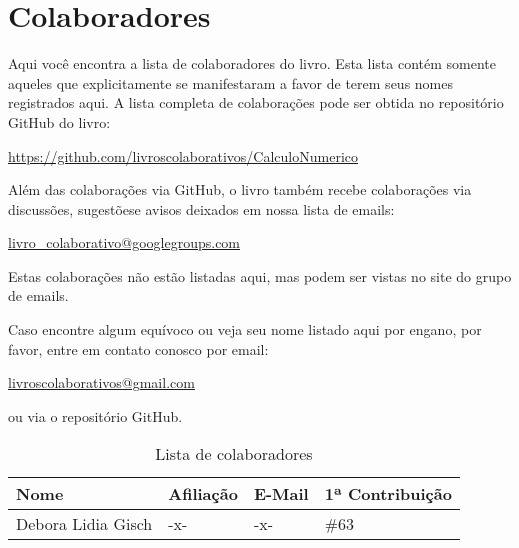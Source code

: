 
%
%
%

\chapter*{Colaboradores}
\fancyhead[LE,RO]{\thepage}

Aqui você encontra a lista de colaboradores do livro. Esta lista contém somente aqueles que explicitamente se manifestaram a favor de terem seus nomes registrados aqui. A lista completa de colaborações pode ser obtida no repositório GitHub do livro:
\begin{center}
  \url{https://github.com/livroscolaborativos/CalculoNumerico}
\end{center}
Além das colaborações via GitHub, o livro também recebe colaborações via discussões, sugestõese avisos deixados em nossa lista de emails:
\begin{center}
\url{livro_colaborativo@googlegroups.com}  
\end{center}
Estas colaborações não estão listadas aqui, mas podem ser vistas no site do grupo de emails.

Caso encontre algum equívoco ou veja seu nome listado aqui por engano, por favor, entre em contato conosco por email:
\begin{center}
  \url{livroscolaborativos@gmail.com}
\end{center}
ou via o repositório GitHub.

\begin{table}[h!]
  \centering
  \caption{Lista de colaboradores}
  \label{tab:colaboradores}
  \begin{tabular}{llll} \hline
    Nome & Afiliação & E-Mail & 1ª Contribuição\\ \hline
    Debora Lidia Gisch & -x- & -x- & \#63 \\
    \hline
  \end{tabular}
\end{table}
